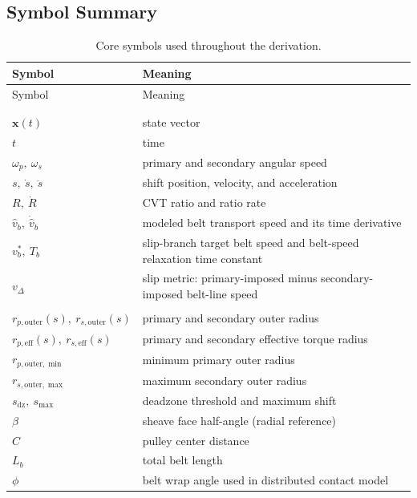 \documentclass[11pt]{article}
\numberwithin{equation}{section}
\newcommand{\vect}[1]{\bm{#1}}
\begin{document}
\subsection{Symbol Summary}\label{sec:symbols}
\begin{center}
\small
\setlength{\LTleft}{0pt}
\setlength{\LTright}{0pt}
\begin{longtable}{@{}p{}p{}@{}}
\toprule
Symbol & Meaning \\ \midrule
\endfirsthead
\toprule
Symbol & Meaning \\ \midrule
\endhead
\bottomrule
\endfoot
\bottomrule
\caption{Core symbols used throughout the derivation.}\label{tab:symbols_core}\\
\endlastfoot
\multicolumn{2}{@{}l}{\textbf{State and kinematics}} \\
$\vect{x}(t)$ & state vector \\
$t$ & time \\
$\omega_p,\ \omega_s$ & primary and secondary angular speed \\
$s,\ \dot s,\ \ddot s$ & shift position, velocity, and acceleration \\
$R,\ \dot R$ & CVT ratio and ratio rate \\
$\hat v_b,\ \dot{\hat v}_b$ & modeled belt transport speed and its time derivative \\
$v_b^\ast,\ T_b$ & slip-branch target belt speed and belt-speed relaxation time constant \\
$v_{\Delta}$ & slip metric: primary-imposed minus secondary-imposed belt-line speed \\
\addlinespace
\multicolumn{2}{@{}l}{\textbf{Geometry}} \\
$r_{p,\mathrm{outer}}(s),\ r_{s,\mathrm{outer}}(s)$ & primary and secondary outer radius \\
$r_{p,\mathrm{eff}}(s),\ r_{s,\mathrm{eff}}(s)$ & primary and secondary effective torque radius \\
$r_{p,\text{outer},\min}$ & minimum primary outer radius \\
$r_{s,\text{outer},\max}$ & maximum secondary outer radius \\
$s_{\mathrm{dz}},\ s_{\max}$ & deadzone threshold and maximum shift \\
$\beta$ & sheave face half-angle (radial reference) \\
$C$ & pulley center distance \\
$L_b$ & total belt length \\
$\phi$ & belt wrap angle used in distributed contact model \\

\end{longtable}
\end{center}
\end{document}

